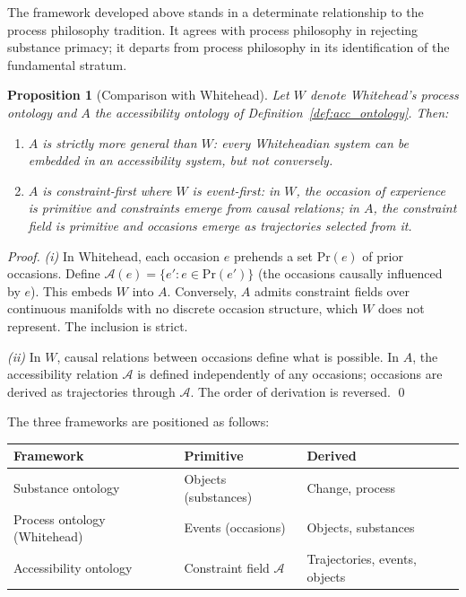 \documentclass[12pt, a4paper, twoside]{article}
\theoremstyle{plain}
\newtheorem{proposition}[theorem]{Proposition}
\theoremstyle{definition}
\theoremstyle{remark}
\newcommand{\Acc}{\mathcal{A}}
\begin{document}
The framework developed above stands in a determinate relationship to the
process philosophy tradition. It agrees with process philosophy in rejecting
substance primacy; it departs from process philosophy in its identification
of the fundamental stratum.

\begin{proposition}[Comparison with Whitehead]
\label{prop:whitehead_comparison}
Let $W$ denote Whitehead's process ontology and $A$ the accessibility ontology
of Definition~\ref{def:acc_ontology}. Then:
\begin{enumerate}[label=(\roman*)]
  \item $A$ is strictly more general than $W$: every Whiteheadian system can
    be embedded in an accessibility system, but not conversely.
  \item $A$ is \emph{constraint-first} where $W$ is \emph{event-first}: in
    $W$, the occasion of experience is primitive and constraints emerge from
    causal relations; in $A$, the constraint field is primitive and occasions
    emerge as trajectories selected from it.
\end{enumerate}
\end{proposition}

\begin{proof}
\emph{(i)} In Whitehead, each occasion $e$ prehends a set $\mathrm{Pr}(e)$
of prior occasions. Define $\Acc(e) = \{e' : e \in \mathrm{Pr}(e')\}$ (the
occasions causally influenced by $e$). This embeds $W$ into $A$. Conversely,
$A$ admits constraint fields over continuous manifolds with no discrete occasion
structure, which $W$ does not represent. The inclusion is strict.

\emph{(ii)} In $W$, causal relations between occasions define what is possible.
In $A$, the accessibility relation $\Acc$ is defined independently of any
occasions; occasions are derived as trajectories through $\Acc$. The order
of derivation is reversed.
\qed
\end{proof}

The three frameworks are positioned as follows:

\begin{center}
\renewcommand{\arraystretch}{1.4}
\begin{tabular}{@{}lll@{}}
\toprule
\textbf{Framework} & \textbf{Primitive} & \textbf{Derived} \\
\midrule
Substance ontology   & Objects (substances) & Change, process \\
Process ontology (Whitehead) & Events (occasions) & Objects, substances \\
Accessibility ontology & Constraint field $\Acc$ & Trajectories, events, objects \\
\bottomrule
\end{tabular}
\end{center}
\end{document}
